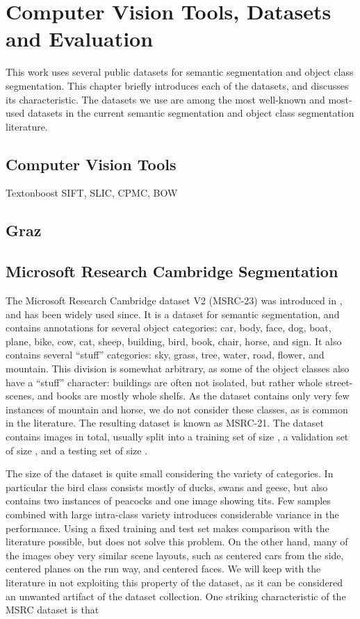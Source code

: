 \chapter{Computer Vision Tools, Datasets and Evaluation}
This work uses several public datasets for semantic segmentation
and object class segmentation. This chapter briefly introduces each of the datasets,
and discusses its characteristic. The datasets we use are among the most well-known
and most-used datasets in the current semantic segmentation and object class segmentation
literature.

\section{Computer Vision Tools}
Textonboost
SIFT, SLIC, CPMC, BOW

\section{Graz}

\section{Microsoft Research Cambridge Segmentation}
The Microsoft Research Cambridge dataset V2 (MSRC-23) was introduced in \citet{shotton2006textonboost}, and
has been widely used since. It is a dataset for semantic segmentation, and contains annotations for
several object categories: car, body, face, dog, boat, plane, bike, cow, cat, sheep,
building, bird, book, chair, horse, and sign. It also contains several ``stuff''
categories: sky, grass, tree, water, road, flower, and mountain.
This division is somewhat arbitrary, as some of the object classes also have a ``stuff'' character:
buildings are often not isolated, but rather whole street-scenes, and books are mostly whole
shelfs.
%
As the dataset contains only very few instances of mountain and horse, we do
not consider these classes, as is common in the literature. The resulting
dataset is known as MSRC-21.
The dataset contains %
images in total, usually split into a training set of size , a validation set of size ,
and a testing set of size .

The size of the dataset is quite small considering the variety of categories. In particular the
bird class consists mostly of ducks, swans and geese, but also contains two instances of peacocks
and one image showing tits. Few samples combined with large intra-class variety introduces considerable
variance in the performance. Using a fixed training and test set makes comparison with the literature possible,
but does not solve this problem.
%
On the other hand, many of the images obey very similar scene layouts, such as centered cars from the side,
centered planes on the run way, and centered faces. We will keep with the literature in not exploiting
this property of the dataset, as it can be considered an unwanted artifact of the dataset collection.
One striking characteristic of the MSRC dataset is that 

